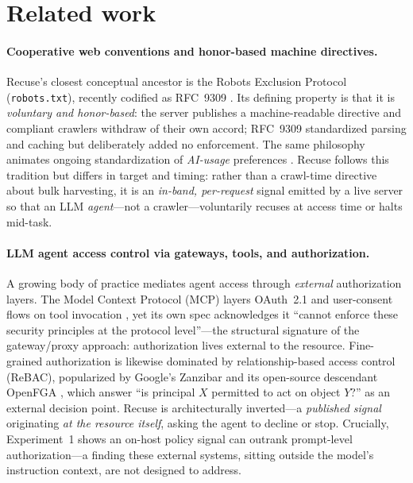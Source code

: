 \documentclass{article}
\begin{document}
\section{Related work}
\label{sec:related}

\paragraph{Cooperative web conventions and honor-based machine directives.}
Recuse's closest conceptual ancestor is the Robots Exclusion Protocol
(\texttt{robots.txt}), recently codified as RFC~9309 \citep{rfc9309}. Its defining
property is that it is \emph{voluntary and honor-based}: the server publishes a
machine-readable directive and compliant crawlers withdraw of their own accord;
RFC~9309 standardized parsing and caching but deliberately added no enforcement.
The same philosophy animates ongoing standardization of \emph{AI-usage}
preferences \citep{aipref-attach}. Recuse follows this tradition but differs in
target and timing: rather than a crawl-time directive about bulk harvesting, it is
an \emph{in-band, per-request} signal emitted by a live server so that an LLM
\emph{agent}---not a crawler---voluntarily recuses at access time or halts
mid-task.

\paragraph{LLM agent access control via gateways, tools, and authorization.}
A growing body of practice mediates agent access through \emph{external}
authorization layers. The Model Context Protocol (MCP) layers OAuth~2.1 and
user-consent flows on tool invocation \citep{mcp2025}, yet its own spec
acknowledges it ``cannot enforce these security principles at the protocol
level''---the structural signature of the gateway/proxy approach: authorization
lives external to the resource. Fine-grained authorization is likewise dominated
by relationship-based access control (ReBAC), popularized by Google's Zanzibar
\citep{pang2019zanzibar} and its open-source descendant OpenFGA \citep{openfga},
which answer ``is principal $X$ permitted to act on object $Y$?'' as an external
decision point. Recuse is architecturally inverted---a \emph{published signal}
originating \emph{at the resource itself}, asking the agent to decline or stop.
Crucially, Experiment~1 shows an on-host policy signal can outrank prompt-level
authorization---a finding these external systems, sitting outside the model's
instruction context, are not designed to address.
\end{document}
